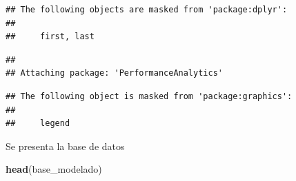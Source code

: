 \documentclass[
  11pt,
  a4paper,
]{book}
\newenvironment{Shaded}{\begin{snugshade}}{\end{snugshade}}
\newcommand{\KeywordTok}[1]{\textcolor[rgb]{0.13,0.29,0.53}{\textbf{#1}}}
\newcommand{\NormalTok}[1]{#1}
\begin{document}
\begin{verbatim}
## The following objects are masked from 'package:dplyr':
## 
##     first, last
\end{verbatim}

\begin{verbatim}
## 
## Attaching package: 'PerformanceAnalytics'
\end{verbatim}

\begin{verbatim}
## The following object is masked from 'package:graphics':
## 
##     legend
\end{verbatim}

Se presenta la base de datos

\begin{Shaded}
\begin{Highlighting}[]
\KeywordTok{head}\NormalTok{(base_modelado)}
\end{Highlighting}
\end{Shaded}
\end{document}
